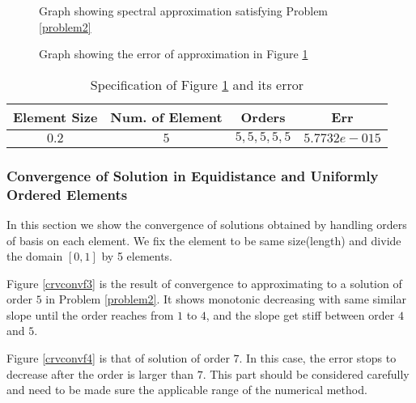 \begin{figure}[h]
\begin{center}
\caption{\label{crvconvf1}Graph showing spectral approximation
satisfying Problem \ref{problem2}}
\end{center}
\end{figure}

\begin{figure}[h]
\begin{center}
\caption{\label{crvconvf2}Graph showing the error of approximation
in Figure \ref{crvconvf1}}
\end{center}
\end{figure}

\begin{table}[h]
\centering \caption{\label{crvconv1t} Specification of
                              Figure \ref{crvconvf1} and its error}
\begin{tabular}{|c|c|c|c|} \hline
Element Size &Num. of Element &Orders    &Err   \\ \hline \hline
$0.2$        &$5$             &$5, 5, 5, 5, 5$ &$5.7732e-015$ \\
\hline
\end{tabular}
\end{table}


\clearpage

\subsubsection{Convergence of Solution in Equidistance and
Uniformly Ordered Elements}

In this section we show the convergence of solutions obtained by
handling orders of basis on each element. We fix the element to be
same size(length) and divide the domain $[0, 1]$ by 5 elements.

Figure \ref{crvconvf3} is the result of convergence to
approximating to a solution of order $5$ in Problem
\ref{problem2}. It shows monotonic decreasing with same similar
slope until the order reaches from $1$ to $4$, and the slope get
stiff between order $4$ and $5$.

Figure \ref{crvconvf4} is that of solution of order $7$. In this
case, the error stops to decrease after the order is larger than
$7$. This part should be considered carefully and need to be made
sure the applicable range of the numerical method.

